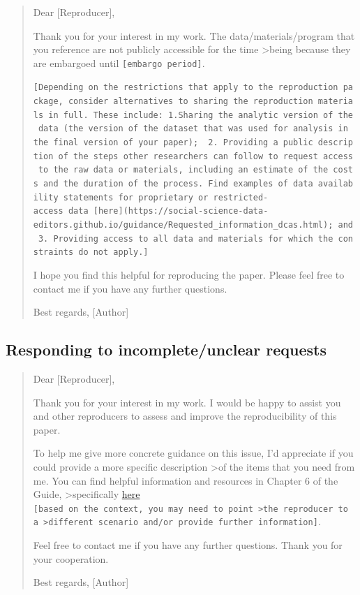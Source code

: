 \documentclass[
]{book}
\begin{document}
\begin{quote}
Dear {[}Reproducer{]},

Thank you for your interest in my work. The data/materials/program that you reference are not publicly accessible for the time \textgreater being because they are embargoed until \texttt{{[}embargo\ period{]}}.

\texttt{{[}Depending\ on\ the\ restrictions\ that\ apply\ to\ the\ reproduction\ package,\ consider\ alternatives\ to\ sharing\ the\ reproduction\ materials\ in\ full.\ These\ include:\ 1.Sharing\ the\ analytic\ version\ of\ the\ data\ (the\ version\ of\ the\ dataset\ that\ was\ used\ for\ analysis\ in\ the\ final\ version\ of\ your\ paper);\ \ 2.\ Providing\ a\ public\ description\ of\ the\ steps\ other\ researchers\ can\ follow\ to\ request\ access\ to\ the\ raw\ data\ or\ materials,\ including\ an\ estimate\ of\ the\ costs\ and\ the\ duration\ of\ the\ process.\ Find\ examples\ of\ data\ availability\ statements\ for\ proprietary\ or\ restricted-access\ data\ {[}here{]}(https://social-science-data-editors.github.io/guidance/Requested\_information\_dcas.html);\ and\ 3.\ Providing\ access\ to\ all\ data\ and\ materials\ for\ which\ the\ constraints\ do\ not\ apply.{]}}

I hope you find this helpful for reproducing the paper. Please feel free to contact me if you have any further questions.

Best regards,
{[}Author{]}
\end{quote}

\hypertarget{responding-to-incompleteunclear-requests}{%
\subsection{Responding to incomplete/unclear requests}\label{responding-to-incompleteunclear-requests}}

\begin{quote}
Dear {[}Reproducer{]},

Thank you for your interest in my work. I would be happy to assist you and other reproducers to assess and improve the reproducibility of this paper.

To help me give more concrete guidance on this issue, I'd appreciate if you could provide a more specific description \textgreater of the items that you need from me. You can find helpful information and resources in Chapter 6 of the Guide, \textgreater specifically \href{https://bitss.github.io/ACRE/guidance-for-a-constructive-exchange-between-reproducers-and-original-authors.html\#asking-for-additional-guidance-when-some-materials-have-been-shared}{here} \texttt{{[}based\ on\ the\ context,\ you\ may\ need\ to\ point\ \textgreater{}the\ reproducer\ to\ a\ \textgreater{}different\ scenario\ and/or\ provide\ further\ information{]}}.

Feel free to contact me if you have any further questions. Thank you for your cooperation.

Best regards,
{[}Author{]}
\end{quote}
\end{document}
